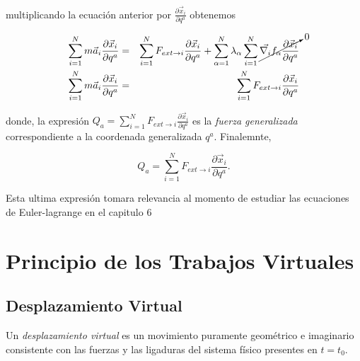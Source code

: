 \documentclass[12pt]{report}
\begin{document}
multiplicando la ecuación anterior por $\displaystyle \frac{\partial \vec{x}_i}{\partial q^a}$ obtenemos

\begin{eqnarray}
\sum_{i=1}^N m\vec{a}_i \frac{\partial \vec{x}_i}{\partial q^a} &=& \sum_{i=1}^N F_{ext \rightarrow i}\frac{\partial \vec{x}_i}{\partial q^a} + \sum_{\alpha=1}^N \lambda_{\alpha} \sum_{i=1}^N \cancelto{0}{\vec{\nabla_{i}} f_{\alpha} \frac{\partial \vec{x}_i}{\partial q^a}} \\
\sum_{i=1}^N m \vec{a}_i \frac{\partial \vec{x}_i}{\partial q^a} &=& \sum_{i=1}^N F_{ext \rightarrow i} \frac{\partial \vec{x}_i}{\partial q^a}
\end{eqnarray}

donde, la expresión $\displaystyle Q_a= \sum_{i=1}^N F_{ext \rightarrow i} \frac{\partial \vec{x}_i}{\partial q^a}$ es la \textit{fuerza generalizada} correspondiente a la coordenada generalizada $q^a$. Finalemnte,

\begin{equation}
Q_a =  \sum_{i=1}^N F_{ext \rightarrow i} \frac{\partial \vec{x}_i}{\partial q^a}.
\end{equation}

Esta ultima expresión tomara relevancia al momento de estudiar las ecuaciones de Euler-lagrange en el capitulo $6$






























\chapter{Principio de los Trabajos Virtuales}


\section{Desplazamiento Virtual}


Un \textit{desplazamiento virtual} es un movimiento puramente geométrico e imaginario consistente con las fuerzas y las ligaduras del sistema físico presentes en $t=t_0$. 
\end{document}
